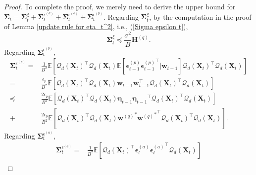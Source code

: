 \documentclass[11pt, letterpaper]{article}
\begin{document}
\begin{proof}
    To complete the proof, we merely need to derive the upper bound for $\boldsymbol{\Sigma}_t=\boldsymbol{\Sigma}_t^\xi+\boldsymbol{\Sigma}_t^{\epsilon^{(a)}}+\boldsymbol{\Sigma}_t^{\epsilon^{(o)}}+\boldsymbol{\Sigma}_t^{\epsilon^{(p)}}$. Regarding $\boldsymbol{\Sigma}_t^\xi$, by the computation in the proof of Lemma \ref{update rule for eta_t^2}, i.e., (\ref{Sigma epsilon t}),
    \begin{equation}
        \label{sigma xi t}\boldsymbol{\Sigma}_t^\xi\preceq \frac{\sigma^2}{B}\mathbf{H}^{(q)}.
    \end{equation}
    Regarding $\boldsymbol{\Sigma}_t^{\epsilon^{(p)}}$,
    \begin{equation}
    \label{bound for sigma tp}
        \begin{aligned}
            \boldsymbol{\Sigma}_t^{\epsilon^{(p)}}=&\frac{1}{B^2}\mathbb{E}\left[{\mathcal{Q}_d(\mathbf{X}_t)}^\top {\mathcal{Q}_d(\mathbf{X}_t)}\mathbb{E}\left[\boldsymbol{\epsilon}_{t-1}^{(p)}{\boldsymbol{\epsilon}_{t-1}^{(p)}}^\top \big| \mathbf{w}_{t-1}\right]{\mathcal{Q}_d(\mathbf{X}_t)}^\top\mathcal{Q}_d(\mathbf{X}_t)\right]\\
            =&\frac{\epsilon_p}{B^2}\mathbb{E}\left[{\mathcal{Q}_d(\mathbf{X}_t)}^\top {\mathcal{Q}_d(\mathbf{X}_t)}\mathbf{w}_{t-1}\mathbf{w}_{t-1}^\top{\mathcal{Q}_d(\mathbf{X}_t)}^\top\mathcal{Q}_d(\mathbf{X}_t)\right]\\
            \preceq &\frac{2\epsilon_p}{B^2}\mathbb{E}\left[{\mathcal{Q}_d(\mathbf{X}_t)}^\top {\mathcal{Q}_d(\mathbf{X}_t)}\boldsymbol{\eta}_{t-1}{\boldsymbol{\eta}_{t-1}}^\top{\mathcal{Q}_d(\mathbf{X}_t)}^\top\mathcal{Q}_d(\mathbf{X}_t)\right]\\
            +&\frac{2\epsilon_p}{B^2}\mathbb{E}\left[{\mathcal{Q}_d(\mathbf{X}_t)}^\top {\mathcal{Q}_d(\mathbf{X}_t)}{\mathbf{w}^{(q)}}^*{{\mathbf{w}^{(q)}}^*}^\top{\mathcal{Q}_d(\mathbf{X}_t)}^\top\mathcal{Q}_d(\mathbf{X}_t)\right].
        \end{aligned}
    \end{equation}
    Regarding $\boldsymbol{\Sigma}_t^{\epsilon^{(a)}}$, 
    \begin{equation}
    \label{sigma a t mul}
        \begin{aligned}
            \boldsymbol{\Sigma}_t^{\epsilon^{(a)}}=&\frac{1}{B^2}\mathbb{E}\left[{\mathcal{Q}_d(\mathbf{X}_t)}^\top \boldsymbol{\epsilon}_t^{(a)}{\boldsymbol{\epsilon}_t^{(a)}}^\top \mathcal{Q}_d(\mathbf{X}_t)\right]\\

\end{aligned}
\end{equation}
\end{proof}
\end{document}
